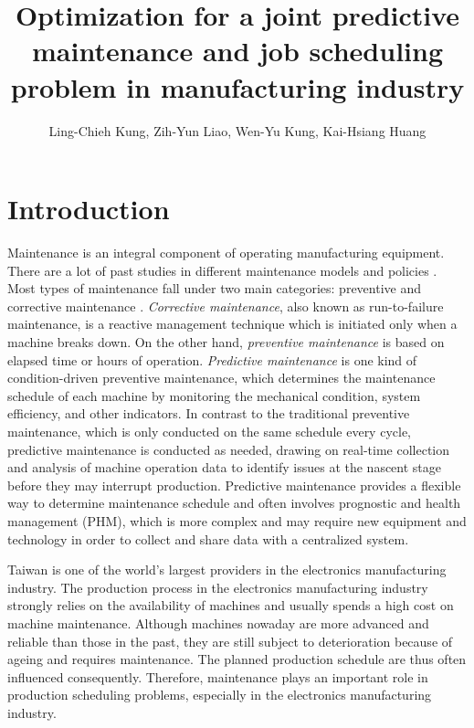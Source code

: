 \documentclass[12pt,a4page]{article}
\title{ Optimization for a joint predictive maintenance and job scheduling problem in manufacturing industry }
\author{Ling-Chieh Kung, Zih-Yun Liao, Wen-Yu Kung, Kai-Hsiang Huang}
\date{}
\theoremstyle{definition}
\theoremstyle{remark}
\begin{document}
\maketitle

\section{Introduction}

Maintenance is an integral component of operating manufacturing equipment. There are a lot of past studies in different maintenance models and policies \citep{wang2002}. Most types of maintenance fall under two main categories: preventive and corrective maintenance \citep{mobley2002}. \textit{Corrective maintenance}, also known as run-to-failure maintenance,  is a reactive management technique which is initiated only when a machine breaks down.  On the other hand, \textit{preventive maintenance} is based on elapsed time or hours of operation. \textit{Predictive maintenance} is one kind of condition-driven preventive maintenance, which determines the maintenance schedule of each machine by monitoring the mechanical condition, system efficiency, and other indicators. In contrast to the traditional preventive maintenance, which is only conducted on the same schedule every cycle, predictive maintenance is conducted as needed, drawing on real-time collection and analysis of machine operation data to identify issues at the nascent stage before they may interrupt production. Predictive maintenance provides a flexible way to determine maintenance schedule and often involves prognostic and health management (PHM), which is more complex and may require new equipment and technology in order to collect and share data with a centralized system.

Taiwan is one of the world's largest providers in the electronics manufacturing industry. The production process in the electronics manufacturing industry strongly relies on the availability of machines and usually spends a high cost on machine maintenance. Although machines nowaday are more advanced and reliable than those in the past, they are still subject to deterioration because of ageing and requires maintenance. The planned production schedule are thus often influenced consequently. Therefore, maintenance plays an important role in production scheduling problems, especially in the electronics manufacturing industry.
\end{document}

